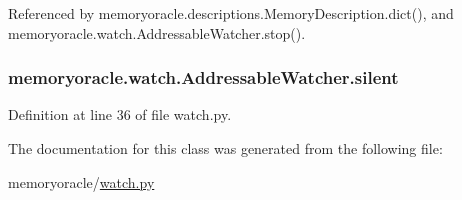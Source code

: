 Referenced by memoryoracle.\+descriptions.\+Memory\+Description.\+dict(), and memoryoracle.\+watch.\+Addressable\+Watcher.\+stop().

\hypertarget{classmemoryoracle_1_1watch_1_1AddressableWatcher_aae157cf9b50d98e099a2c7f98b25634e}{}
\subsubsection[{silent}]{\setlength{\rightskip}{0pt plus 5cm}memoryoracle.\+watch.\+Addressable\+Watcher.\+silent}\label{classmemoryoracle_1_1watch_1_1AddressableWatcher_aae157cf9b50d98e099a2c7f98b25634e}


Definition at line 36 of file watch.\+py.



The documentation for this class was generated from the following file\+:\begin{DoxyCompactItemize}
\item 
memoryoracle/\hyperlink{watch_8py}{watch.\+py}\end{DoxyCompactItemize}

